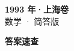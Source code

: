 \documentclass[zihao=-4, a4paper]{ctexart}
\begin{document}
\begin{center}
  {\Large\bfseries 1993 年·上海卷}\\[4pt]
  {\large 数学 · 简答版}
\end{center}
\medskip
{}

\clearpage
{}
\begin{center}{\Large\bfseries 答案速查}\end{center}
\medskip

\end{document}
